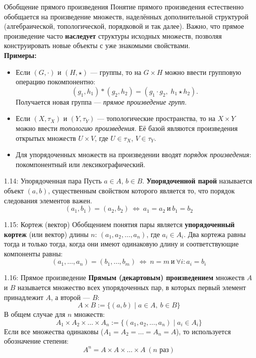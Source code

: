 \documentclass[a4paper,12pt]{article}
\begin{document}
\begin{propertybox}{Обобщение прямого произведения}
	Понятие прямого произведения естественно обобщается на произведение множеств, наделённых дополнительной структурой (алгебраической, топологической, порядковой и так далее). Важно, что прямое произведение часто \textbf{наследует} структуры исходных множеств, позволяя конструировать новые объекты с уже знакомыми свойствами.\\
	
	\textbf{Примеры:}
	\begin{itemize}
		\item Если $(G,\cdot)$ и $(H,\star)$ — группы, то на $G \times H$ можно ввести групповую операцию покомпонентно:
		\[
		(g_1,h_1) \ast (g_2,h_2) = (g_1 \cdot g_2,\; h_1 \star h_2).
		\]
		Получается новая группа — \textit{прямое произведение групп}.
		
		\item Если $(X,\tau_X)$ и $(Y,\tau_Y)$ — топологические пространства, то на $X \times Y$ можно ввести \textit{топологию произведения}. Её базой являются произведения открытых множеств $U \times V$, где $U \in \tau_X$, $V \in \tau_Y$.
		
		\item Для упорядоченных множеств на произведении вводят \textit{порядок произведения}: покомпонентный или лексикографический.
	\end{itemize}
\end{propertybox}


\begin{definitionbox}{1.14: Упорядоченная пара}
	Пусть $a \in A$, $b \in B$. \textbf{Упорядоченной парой} называется объект $(a, b)$, существенным свойством которого является то, что порядок следования элементов важен.
	\[ (a_1, b_1) = (a_2, b_2) \ \Longleftrightarrow\ a_1 = a_2 \ \text{и} \ b_1 = b_2 \]
\end{definitionbox}

\begin{definitionbox}{1.15: Кортеж (вектор)}
	Обобщением понятия пары является \textbf{упорядоченный кортеж} (или вектор) длины $n$: $(a_1, a_2, \dots, a_n)$, где $a_i \in A_i$.
	Два кортежа равны тогда и только тогда, когда они имеют одинаковую длину и соответствующие компоненты равны:
	\[ (a_1, \dots, a_n) = (b_1, \dots, b_m) \ \Longleftrightarrow\ n = m \ \text{и} \ \forall i: a_i = b_i \]
\end{definitionbox}

\begin{definitionbox}{1.16: Прямое произведение}
	\textbf{Прямым (декартовым) произведением} множеств $A$ и $B$ называется множество всех упорядоченных пар, в которых первый элемент принадлежит $A$, а второй — $B$:
	\[ A \times B := \{ (a, b) \mid a \in A,\ b \in B \} \]
	В общем случае для $n$ множеств:
	\[ A_1 \times A_2 \times \dots \times A_n := \{ (a_1, a_2, \dots, a_n) \mid a_i \in A_i \} \]
	Если все множества одинаковы ($A_1 = A_2 = \dots = A_n = A$), то используется обозначение степени:
	\[ A^n = A \times A \times \dots \times A \ (\text{$n$ раз}) \]
\end{definitionbox}
\end{document}
